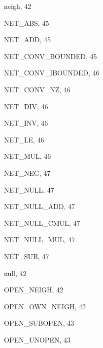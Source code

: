 \begin{theindex}
  \item {\ptt neigh}, 42
  \item {\ptt NET\_ABS}, 45
  \item {\ptt NET\_ADD}, 45
  \item {\ptt NET\_CONV\_BOUNDED}, 45
  \item {\ptt NET\_CONV\_IBOUNDED}, 46
  \item {\ptt NET\_CONV\_NZ}, 46
  \item {\ptt NET\_DIV}, 46
  \item {\ptt NET\_INV}, 46
  \item {\ptt NET\_LE}, 46
  \item {\ptt NET\_MUL}, 46
  \item {\ptt NET\_NEG}, 47
  \item {\ptt NET\_NULL}, 47
  \item {\ptt NET\_NULL\_ADD}, 47
  \item {\ptt NET\_NULL\_CMUL}, 47
  \item {\ptt NET\_NULL\_MUL}, 47
  \item {\ptt NET\_SUB}, 47
  \item {\ptt null}, 42

  \indexspace

  \item {\ptt OPEN\_NEIGH}, 42
  \item {\ptt OPEN\_OWN\_NEIGH}, 42
  \item {\ptt OPEN\_SUBOPEN}, 43
  \item {\ptt OPEN\_UNOPEN}, 43

  \indexspace


\end{theindex}
